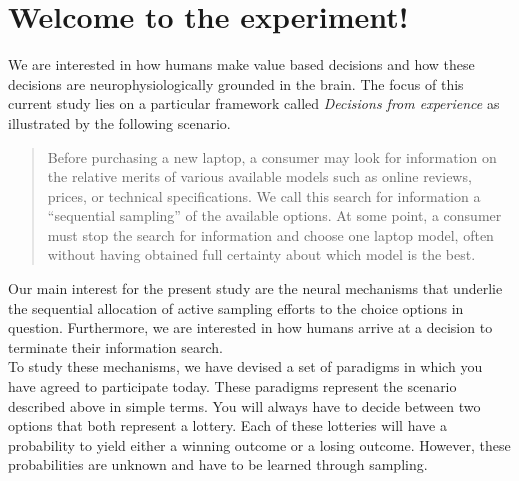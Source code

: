 \documentclass[12pt, oneside]{scrartcl}
\begin{document}
\section{Welcome to the experiment!}

We are interested in how humans make value based decisions and how these decisions are neurophysiologically grounded in the brain. The focus of this current study lies on a particular framework called \textit{Decisions from experience} as illustrated by the following scenario.

\begin{quotation}
\noindent Before purchasing a new laptop, a consumer may look for information on the relative merits of various available models such as online reviews, prices, or technical specifications. We call this search for information a “sequential sampling” of the available options. At some point, a consumer must stop the search for information and choose one laptop model, often without having obtained full certainty about which model is the best.
\end{quotation}


Our main interest for the present study are the neural mechanisms that underlie the sequential allocation of active sampling efforts to the choice options in question. Furthermore, we are interested in how humans arrive at a decision to terminate their information search. \\

To study these mechanisms, we have devised a set of paradigms in which you have agreed to participate today. These paradigms represent the scenario described above in simple terms. You will always have to decide between two options that both represent a lottery. Each of these lotteries will have a probability to yield either a winning outcome or a losing outcome. However, these probabilities are unknown and have to be learned through sampling. \\
\end{document}
